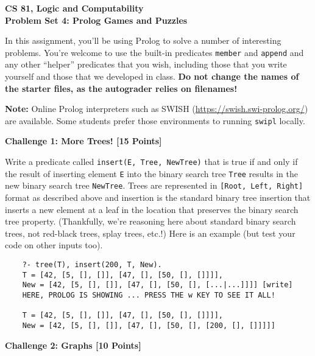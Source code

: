 \documentclass[12pt]{article}
\newcommand{\Problem}[3]{\mbox{} \newline \noindent \textbf{\textbf{Challenge #1: #2 [#3 Points] \\ }}}
\begin{document}
\begin{center}
	\bf
	CS 81, Logic and Computability  \\
	Problem Set 4:  Prolog Games and Puzzles \\
\end{center}

In this assignment, you'll be using Prolog to solve a number of interesting problems.  You're welcome to use the built-in predicates
 \verb+member+ and \verb+append+ and any other ``helper'' predicates that you wish, including those that you write yourself and those that we developed in class. \textbf{Do not change the names of the starter files, as the autograder relies on filenames!}

\textbf{Note:} Online Prolog interpreters such as SWISH (\href{https://swish.swi-prolog.org/}{https://swish.swi-prolog.org/}) are available. Some students prefer those environments to running \texttt{swipl} locally.
 
\Problem{1}{More Trees!}{15}

Write a predicate called \verb+insert(E, Tree, NewTree)+ that is true if and only if the result of inserting element \verb+E+ into the binary search tree \verb+Tree+ results in the new binary search tree
	\verb+NewTree+.  Trees are represented in \verb+[Root, Left, Right]+ format as described above and insertion is the standard binary tree insertion that inserts a new element at a leaf in the location that
	preserves the binary search tree property.
	(Thankfully, we're reasoning here about standard binary search trees, not red-black trees, splay trees, etc.!)
	 Here is an example (but test your code on other inputs too).
	\begin{verbatim}
	?- tree(T), insert(200, T, New).
	T = [42, [5, [], []], [47, [], [50, [], []]]],
	New = [42, [5, [], []], [47, [], [50, [], [...|...]]]] [write]  
	HERE, PROLOG IS SHOWING ... PRESS THE w KEY TO SEE IT ALL!

	T = [42, [5, [], []], [47, [], [50, [], []]]],
	New = [42, [5, [], []], [47, [], [50, [], [200, [], []]]]] 
	\end{verbatim}

\Problem{2}{Graphs}{10}
\end{document}
